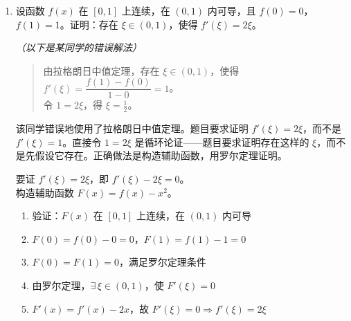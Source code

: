 \begin{enumerate}[itemsep=1.2em, left=0pt, label={}]
\begin{solution}
    \par{}%
    集合运算要先标准化集合表示（区间或明确列举），再运算。边界点要单独验证。

    \par{}%
    变式：若条件改为 $x^2-5x+6 < 0$（严格不等式），求 $A \cap B$。
\end{solution}

\vspace{0.5cm}

\item \typeSolve\quad{}

\medskip
\noindent 设函数 $f(x)$ 在 $[0,1]$ 上连续，在 $(0,1)$ 内可导，且 $f(0)=0$，$f(1)=1$。证明：存在 $\xi \in (0,1)$，使得 $f'(\xi) = 2\xi$。

\medskip
\noindent\textit{\color{gray!70!black}（以下是某同学的错误解法）}
\begin{quote}
    \color{gray!50!black}
    由拉格朗日中值定理，存在 $\xi \in (0,1)$，使得 $f'(\xi) = \dfrac{f(1)-f(0)}{1-0} = 1$。\\
    令 $1 = 2\xi$，得 $\xi = \frac{1}{2}$。
\end{quote}

\begin{solution}
    \par{}%
    该同学错误地使用了拉格朗日中值定理。题目要求证明 $f'(\xi) = 2\xi$，而不是 $f'(\xi) = 1$。直接令 $1 = 2\xi$ 是循环论证——题目要求证明存在这样的 $\xi$，而不是先假设它存在。正确做法是构造辅助函数，用罗尔定理证明。

    \par{}%
    要证 $f'(\xi) = 2\xi$，即 $f'(\xi) - 2\xi = 0$。\\
    构造辅助函数 $F(x) = f(x) - x^2$。
    \begin{enumerate}[label=(\arabic*), leftmargin=2em]
        \item 验证：$F(x)$ 在 $[0,1]$ 上连续，在 $(0,1)$ 内可导
        \item $F(0) = f(0) - 0 = 0$，$F(1) = f(1) - 1 = 0$
        \item $F(0) = F(1) = 0$，满足罗尔定理条件
        \item 由罗尔定理，$\exists\,\xi\in(0,1)$，使 $F'(\xi)=0$
        \item $F'(x) = f'(x) - 2x$，故 $F'(\xi)=0 \Rightarrow f'(\xi) = 2\xi$
    \end{enumerate}


\end{solution}
\end{enumerate}
